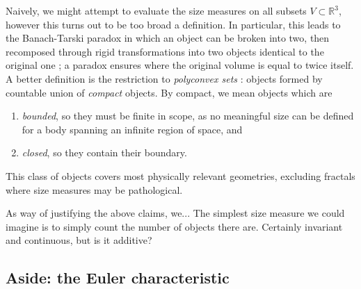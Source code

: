 Naively, we might attempt to evaluate the size measures on all subsets $V \subset \mathbb{R}^3$, however this turns out to be too broad a definition.
In particular, this leads to the Banach-Tarski paradox in which an object can be broken into two, then recomposed through rigid transformations into two objects identical to the original one  \cite{BanachFM1924}; a paradox ensures where the original volume is equal to twice itself.
A better definition is the restriction to \emph{polyconvex sets}%
: objects formed by countable union of \emph{compact} objects.
By compact, we mean objects which are
\begin{enumerate}
\item \emph{bounded}, so they must be finite in scope, as no meaningful size can be defined for a body spanning an infinite region of space, and
\item \emph{closed}, so they contain their boundary.
\end{enumerate}
This class of objects covers most physically relevant geometries, excluding fractals where size measures may be pathological.


As way of justifying the above claims, we...
The simplest size measure we could imagine is to simply count the number of objects there are.
Certainly invariant and continuous, but is it additive?

\subsection{Aside: the Euler characteristic}

